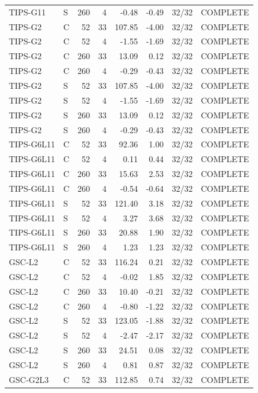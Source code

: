 \begin{longtable}{llrrrrrl}
TIPS-G11 & S & 260 & 4 & -0.48 & -0.49 & 32/32 & COMPLETE \\
TIPS-G2 & C & 52 & 33 & 107.85 & -4.00 & 32/32 & COMPLETE \\
TIPS-G2 & C & 52 & 4 & -1.55 & -1.69 & 32/32 & COMPLETE \\
TIPS-G2 & C & 260 & 33 & 13.09 & 0.12 & 32/32 & COMPLETE \\
TIPS-G2 & C & 260 & 4 & -0.29 & -0.43 & 32/32 & COMPLETE \\
TIPS-G2 & S & 52 & 33 & 107.85 & -4.00 & 32/32 & COMPLETE \\
TIPS-G2 & S & 52 & 4 & -1.55 & -1.69 & 32/32 & COMPLETE \\
TIPS-G2 & S & 260 & 33 & 13.09 & 0.12 & 32/32 & COMPLETE \\
TIPS-G2 & S & 260 & 4 & -0.29 & -0.43 & 32/32 & COMPLETE \\
TIPS-G6L11 & C & 52 & 33 & 92.36 & 1.00 & 32/32 & COMPLETE \\
TIPS-G6L11 & C & 52 & 4 & 0.11 & 0.44 & 32/32 & COMPLETE \\
TIPS-G6L11 & C & 260 & 33 & 15.63 & 2.53 & 32/32 & COMPLETE \\
TIPS-G6L11 & C & 260 & 4 & -0.54 & -0.64 & 32/32 & COMPLETE \\
TIPS-G6L11 & S & 52 & 33 & 121.40 & 3.18 & 32/32 & COMPLETE \\
TIPS-G6L11 & S & 52 & 4 & 3.27 & 3.68 & 32/32 & COMPLETE \\
TIPS-G6L11 & S & 260 & 33 & 20.88 & 1.90 & 32/32 & COMPLETE \\
TIPS-G6L11 & S & 260 & 4 & 1.23 & 1.23 & 32/32 & COMPLETE \\
GSC-L2 & C & 52 & 33 & 116.24 & 0.21 & 32/32 & COMPLETE \\
GSC-L2 & C & 52 & 4 & -0.02 & 1.85 & 32/32 & COMPLETE \\
GSC-L2 & C & 260 & 33 & 10.40 & -0.21 & 32/32 & COMPLETE \\
GSC-L2 & C & 260 & 4 & -0.80 & -1.22 & 32/32 & COMPLETE \\
GSC-L2 & S & 52 & 33 & 123.05 & -1.88 & 32/32 & COMPLETE \\
GSC-L2 & S & 52 & 4 & -2.47 & -2.17 & 32/32 & COMPLETE \\
GSC-L2 & S & 260 & 33 & 24.51 & 0.08 & 32/32 & COMPLETE \\
GSC-L2 & S & 260 & 4 & 0.81 & 0.87 & 32/32 & COMPLETE \\
GSC-G2L3 & C & 52 & 33 & 112.85 & 0.74 & 32/32 & COMPLETE \\

\end{longtable}
